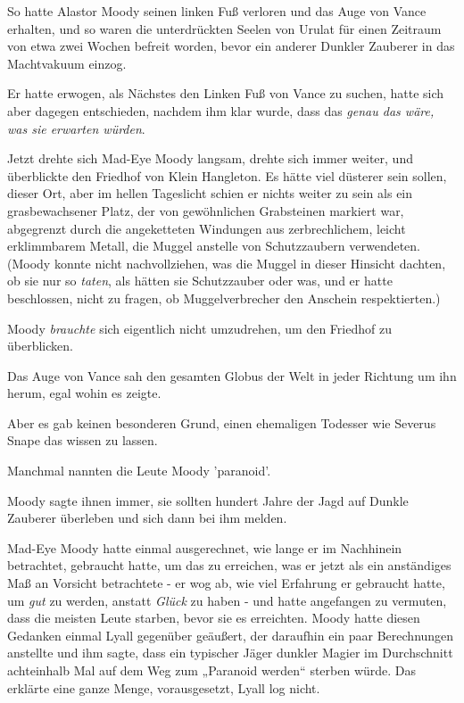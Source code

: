 {So hatte Alastor Moody seinen linken Fuß verloren und das Auge von Vance erhalten, und so waren die unterdrückten Seelen von Urulat für einen Zeitraum von etwa zwei Wochen befreit worden, bevor ein anderer Dunkler Zauberer in das Machtvakuum einzog.

Er hatte erwogen, als Nächstes den Linken Fuß von Vance zu suchen, hatte sich aber dagegen entschieden, nachdem ihm klar wurde, dass das \emph{genau das wäre, was sie erwarten würden}.

Jetzt drehte sich Mad-Eye Moody langsam, drehte sich immer weiter, und überblickte den Friedhof von Klein Hangleton. Es hätte viel düsterer sein sollen, dieser Ort, aber im hellen Tageslicht schien er nichts weiter zu sein als ein grasbewachsener Platz, der von gewöhnlichen Grabsteinen markiert war, abgegrenzt durch die angeketteten Windungen aus zerbrechlichem, leicht erklimmbarem Metall, die Muggel anstelle von Schutzzaubern verwendeten. (Moody konnte nicht nachvollziehen, was die Muggel in dieser Hinsicht dachten, ob sie nur so \emph{taten}, als hätten sie Schutzzauber oder was, und er hatte beschlossen, nicht zu fragen, ob Muggelverbrecher den Anschein respektierten.)

Moody \emph{brauchte} sich eigentlich nicht umzudrehen, um den Friedhof zu überblicken.

Das Auge von Vance sah den gesamten Globus der Welt in jeder Richtung um ihn herum, egal wohin es zeigte.

Aber es gab keinen besonderen Grund, einen ehemaligen Todesser wie Severus Snape das wissen zu lassen.

Manchmal nannten die Leute Moody 'paranoid'.

Moody sagte ihnen immer, sie sollten hundert Jahre der Jagd auf Dunkle Zauberer überleben und sich dann bei ihm melden.

Mad-Eye Moody hatte einmal ausgerechnet, wie lange er im Nachhinein betrachtet, gebraucht hatte, um das zu erreichen, was er jetzt als ein anständiges Maß an Vorsicht betrachtete - er wog ab, wie viel Erfahrung er gebraucht hatte, um \emph{gut} zu werden, anstatt \emph{Glück} zu haben - und hatte angefangen zu vermuten, dass die meisten Leute starben, bevor sie es erreichten. Moody hatte diesen Gedanken einmal Lyall gegenüber geäußert, der daraufhin ein paar Berechnungen anstellte und ihm sagte, dass ein typischer Jäger dunkler Magier im Durchschnitt achteinhalb Mal auf dem Weg zum „Paranoid werden“ sterben würde. Das erklärte eine ganze Menge, vorausgesetzt, Lyall log nicht.

}
